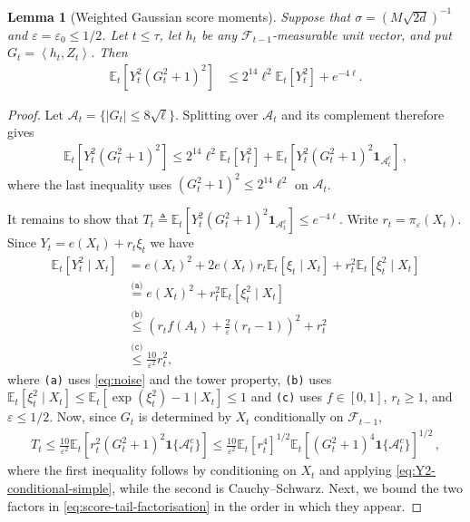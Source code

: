 \documentclass[11pt]{article}
\newtheorem{lemma}[lemma]{Lemma}
\newcommand{\reason}[1]{\texttt{(#1)}}
\newcommand{\explan}[2]{\stackrel{\reason{#2}}{#1}}
\newcommand{\E}{\mathbb E}
\newcommand{\F}{\mathcal F}
\newcommand{\1}{\mathbf 1}
\newcommand{\eps}{\varepsilon}
\newcommand{\ip}[2]{\left\langle #1,#2\right\rangle}
\begin{document}
\begin{lemma}[Weighted Gaussian score moments]
    \label{lem:gaussian-score-localisation}
    Suppose that $\sigma=(M\sqrt{2d})^{-1}$ and
    $\eps=\eps_0\leq1/2$. Let $t\leq\tau$, let
    $h_t$ be any $\F_{t-1}$-measurable unit vector, and put
    $G_t=\ip{h_t}{Z_t}$. Then
    \begin{align}
        \E_t\left[
            Y_t^2\left(
            G_t^2 + 1
            \right)^2
            \right]
         & \leq
        2^{14}\ell^2 \E_t[Y_t^2]+e^{-4\ell}.
        \label{eq:H-score-second-moment}
    \end{align}
\end{lemma}
\begin{proof}
    Let
    $\mathcal A_t
        =
        \{|G_t|\leq8\sqrt\ell\}$.
    Splitting over $\mathcal A_t$ and its complement therefore gives
    \begin{align}
        \E_t\left[Y_t^2(G_t^2+1)^2\right]
        \leq
        2^{14}\ell^2\E_t[Y_t^2]
        +\E_t\left[Y_t^2(G_t^2+1)^2\1_{\mathcal A_t^c}\right]\,,
        \label{eq:score-localisation-split}
    \end{align}
    where the last inequality uses $(G_t^2+1)^2\leq2^{14}\ell^2$ on $\mathcal A_t$.

    It remains to show that $T_t \triangleq \E_t\left[Y_t^2(G_t^2+1)^2\1_{\mathcal A_t^c}\right] \leq e^{-4\ell}$.
    Write $r_t=\pi_\eps(X_t)$.
    Since $Y_t=e(X_t)+r_t\xi_t$ we have
    \begin{align}
        \E_t[Y_t^2\mid X_t]
         & =
        e(X_t)^2
        + 2e(X_t)r_t\E_t[\xi_t\mid X_t]
        +r_t^2\E_t[\xi_t^2\mid X_t]
        \\
         & \explan{=}{a}
        e(X_t)^2
        +r_t^2\E_t[\xi_t^2\mid X_t] \\
         & \explan{\leq}{b}
        \left(
        r_t f(A_t)+\frac2\eps(r_t-1)
        \right)^2
        +r_t^2                      \\
         & \explan{\leq}{c}
        \frac{10}{\eps^2}r_t^2,
        \label{eq:Y2-conditional-simple}
    \end{align}
    where \reason{a} uses \eqref{eq:noise} and the tower property,
    \reason{b} uses
    $\E_t[\xi_t^2\mid X_t]\leq \E_t[\exp(\xi_t^2) - 1\mid X_t]\leq 1$ and
    \reason{c} uses $f\in[0,1]$, $r_t\geq1$, and $\eps\leq1/2$.
    Now, since $G_t$ is determined by $X_t$ conditionally on $\F_{t-1}$,
    \begin{align}
        T_t
        \leq
        \frac{10}{\eps^2}
        \E_t\left[
            r_t^2(G_t^2+1)^2\1\{\mathcal A_t^c\}
            \right]
        \leq
        \frac{10}{\eps^2}
        \E_t[r_t^4]^{1/2}
        \E_t\left[
            (G_t^2+1)^4\1\{\mathcal A_t^c\}
            \right]^{1/2}\,,
        \label{eq:score-tail-factorisation}
    \end{align}
    where the first inequality follows by conditioning on $X_t$ and applying
    \eqref{eq:Y2-conditional-simple}, while the second is Cauchy--Schwarz.
    Next, we bound the two factors in \eqref{eq:score-tail-factorisation} in the order in which they appear.


\end{proof}
\end{document}
